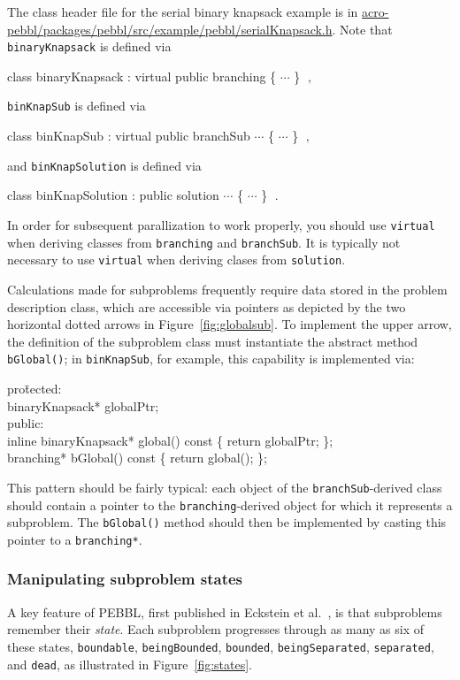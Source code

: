 The class header file for the serial binary knapsack example is in
\url{acro-pebbl/packages/pebbl/src/example/pebbl/serialKnapsack.h}. Note that
\texttt{binaryKnapsack} is defined via
\begin{codeblock}
class binaryKnapsack : virtual public branching \{ $\cdots$ \}
$\;,$
\end{codeblock}
\texttt{binKnapSub} is defined via
\begin{codeblock}
class binKnapSub : virtual public branchSub $\cdots$ \{ $\cdots$ \}
$\;,$
\end{codeblock}
and \texttt{binKnapSolution} is defined via
\begin{codeblock}
class binKnapSolution : public solution $\cdots$ \{ $\cdots$ \} $\;.$
\end{codeblock}
In order for subsequent parallization to work properly, you should use
\texttt{virtual} when deriving classes from \texttt{branching} and
\texttt{branchSub}.  It is typically not necessary to use
\texttt{virtual} when deriving clases from \texttt{solution}.

Calculations made for subproblems frequently require data
stored in the problem description class, which are accessible via
pointers as depicted by the two horizontal dotted arrows in
Figure~\ref{fig:globalsub}.  To implement the upper arrow, the
definition of the subproblem class must instantiate the abstract
method \texttt{bGlobal()}; in \texttt{binKnapSub}, for example, this
capability is implemented via:
\begin{codeblock}
pro\=tected: \\
\>  binaryKnapsack* globalPtr;\\
public:\\
\>  inline binaryKnapsack* global() const \{ return globalPtr; \};\\
\>  branching* bGlobal() const \{ return global(); \};\\
\end{codeblock}
This pattern should be fairly typical: each object of the
\texttt{branchSub}-derived class should contain a pointer to the
\texttt{branching}-derived object for which it represents a
subproblem.  The \texttt{bGlobal()} method should then be implemented
by casting this pointer to a \texttt{branching*}.


\subsubsection{Manipulating subproblem states}
A key feature of PEBBL, first published in Eckstein et al.~\cite{EPH00}, is that
subproblems remember their \emph{state}.  Each subproblem progresses
through as many as six of these states, \texttt{boundable},
\texttt{beingBounded}, \texttt{bounded}, \texttt{beingSeparated}, 
\texttt{separated}, and \texttt{dead}, as illustrated in
Figure~\ref{fig:states}.

